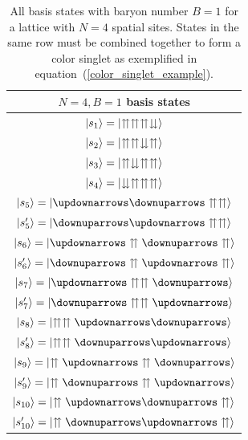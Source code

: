 \documentclass[twocolumn,aps,showpacs,prb,superscriptaddress,floatfix,10pt,nofootinbib]{revtex4-2}
\renewcommand{\eqref}[1]{equation~(\ref{#1})}
\begin{document}
\begin{table}[]
	\centering
	\begin{tabular}{c}
		\toprule
		$N = 4, B = 1$ basis states \\
		\midrule
		$\ket{s_1} = \ket{\upuparrows \upuparrows \upuparrows \downdownarrows}$ \\
		\midrule
		$\ket{s_2} = \ket{\upuparrows \upuparrows \downdownarrows \upuparrows}$\\
		\midrule
		$\ket{s_3} = \ket{\upuparrows \downdownarrows \upuparrows \upuparrows}$\\
		\midrule
		$\ket{s_4} = \ket{\downdownarrows \upuparrows \upuparrows \upuparrows}$\\   
		\midrule
		$\ket{s_5} = \ket{\updownarrows \downuparrows \upuparrows \upuparrows}$ \\
		$\ket{s_5^\prime} = \ket{\downuparrows \updownarrows \upuparrows \upuparrows}$\\ 
		\midrule
		$\ket{s_6} = \ket{\updownarrows  \upuparrows \downuparrows \upuparrows}$ \\
		$\ket{s_6^\prime} = \ket{\downuparrows \upuparrows \updownarrows  \upuparrows}$\\ 
		\midrule
		$\ket{s_7} = \ket{\updownarrows  \upuparrows \upuparrows \downuparrows }$ \\
		$\ket{s_7^\prime} = \ket{\downuparrows \upuparrows  \upuparrows \updownarrows }$\\ 
		\midrule
		$\ket{s_8} = \ket{ \upuparrows \upuparrows\updownarrows  \downuparrows }$ \\
		$\ket{s_8^\prime} = \ket{ \upuparrows  \upuparrows \downuparrows \updownarrows }$\\ 
		\midrule
		$\ket{s_9} = \ket{ \upuparrows \updownarrows \upuparrows \downuparrows }$ \\
		$\ket{s_9^\prime} = \ket{ \upuparrows \downuparrows \upuparrows  \updownarrows }$\\ 
		\midrule
		$\ket{s_{10}} = \ket{ \upuparrows \updownarrows \downuparrows  \upuparrows}$ \\
		$\ket{s_{10}^\prime} = \ket{ \upuparrows \downuparrows   \updownarrows \upuparrows}$\\ 
		\bottomrule
	\end{tabular}
	\caption{All basis states with baryon number $B=1$ for a lattice with $N=4$ spatial sites. States in the same row must be combined together to form a color singlet as exemplified in \eqref{color_singlet_example}.}
	\label{t1}
\end{table}
\end{document}
